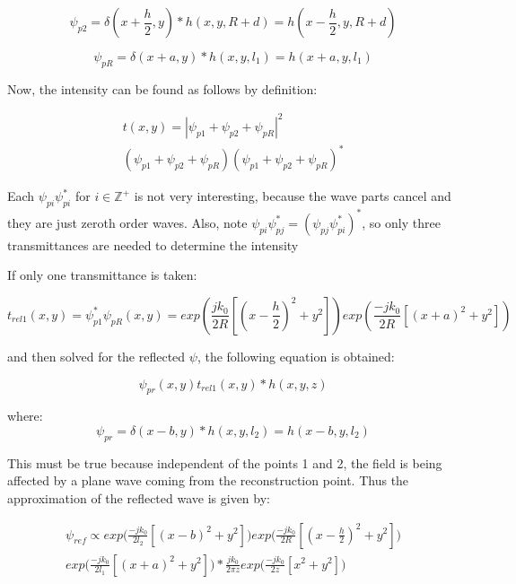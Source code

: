\documentclass[12pt]{article}
\begin{document}
\begin{equation}
	\psi_{p2} = \delta(x + \frac{h}{2},y)*h(x,y,R + d) =
	h(x - \frac{h}{2},y,R + d)
\end{equation}

\begin{equation}
	\psi_{pR} = \delta(x + a,y)*h(x,y,l_{1}) = h(x + a,y,l_{1})
\end{equation}

Now, the intensity can be found as follows by definition:

\begin{equation}
	\begin{multlined}
	t(x,y) = |\psi_{p1} + \psi_{p2} + \psi_{pR}|^2
	\\ (\psi_{p1} + \psi_{p2} + \psi_{pR})(\psi_{p1} + \psi_{p2} + \psi_{pR})^*
	\end{multlined}
\end{equation}

Each \(\psi_{pi}\psi_{pi}^*\) for \(i \in \mathbb{Z}^+\) is not very interesting, because the wave parts cancel and they are just zeroth order waves.
Also, note \(\psi_{pi}\psi_{pj}^* = (\psi_{pj}\psi_{pi}^*)^* \), so only three transmittances are needed to determine the intensity

If only one transmittance is taken:

\begin{equation}
	t_{rel1}(x,y) = \psi_{p1}^*\psi_{pR}(x,y) = exp(\frac{jk_{0}}{2R}[(x - \frac{h}{2})^2 + y^2])exp(\frac{-jk_{0}}{2R}[(x + a)^2 + y^2])
\end{equation}

and then solved for the reflected \(\psi\), the following equation is obtained:

\begin{equation}
	\psi_{pr}(x,y)t_{rel1}(x,y)*h(x,y,z)
\end{equation}

where:
\begin{equation}
	\psi_{pr} = \delta(x - b,y)*h(x,y,l_{2}) = h(x - b,y,l_{2})
\end{equation}

This must be true because independent of the points 1 and 2, the field is being
affected by a plane wave coming from the reconstruction point. Thus the approximation of the reflected wave is given by:

\begin{equation}
	\begin{multlined}
	\psi_{ref} \propto exp\bigg(\frac{-jk_{0}}{2l_{2}}[(x - b)^2 + y^2]\bigg)
	exp\bigg(\frac{-jk_{0}}{2R}[(x - \frac{h}{2})^2 + y^2]\bigg)
	\\exp\bigg(\frac{-jk_{0}}{2l_{1}}[(x + a)^2 + y^2]\bigg)
	*\frac{jk_{0}}{2\pi z}exp\bigg(\frac{-jk_{0}}{2z}[x^2 + y^2]\bigg)
	\end{multlined}
\end{equation}
\end{document}

